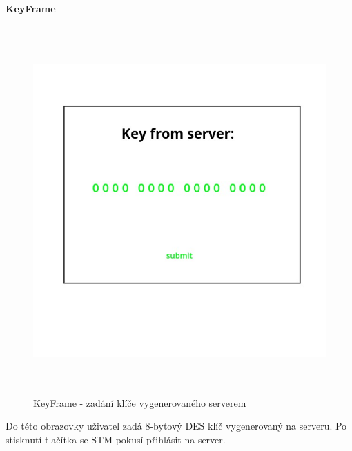 \paragraph{KeyFrame}
\begin{figure}[H]\centering
\includegraphics[width=140mm, height=140mm]{../img/key_frame.jpg}
\caption{KeyFrame - zadání klíče vygenerovaného serverem}
\label{key-frame}
\end{figure}

Do této obrazovky uživatel zadá 8-bytový DES klíč vygenerovaný na serveru.
Po stisknutí tlačítka  se STM pokusí přihlásit na server.

